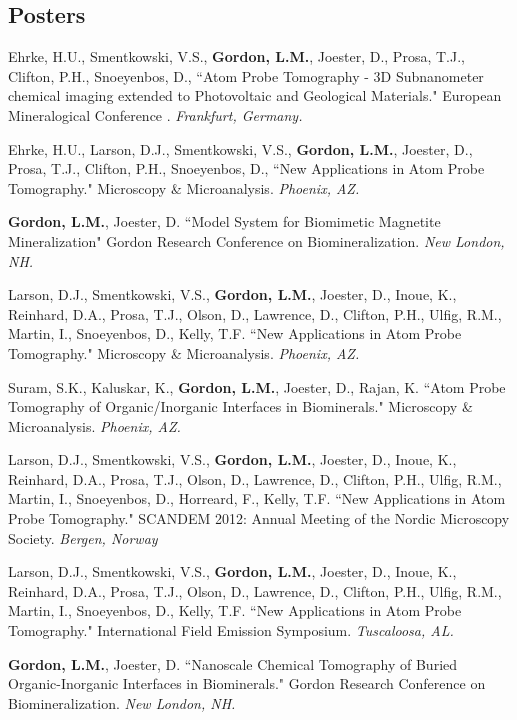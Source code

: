\subsection*{Posters}
Ehrke, H.U., Smentkowski, V.S., \textbf{Gordon, L.M.}, Joester, D., Prosa, T.J., Clifton, P.H., Snoeyenbos, D., ``Atom Probe Tomography - 3D Subnanometer chemical imaging extended to Photovoltaic and Geological Materials." European Mineralogical Conference . \emph{Frankfurt, Germany.}

\begingroup\setlength{\parskip}{0.15cm}
Ehrke, H.U., Larson, D.J., Smentkowski, V.S., \textbf{Gordon, L.M.}, Joester, D., Prosa, T.J., Clifton, P.H., Snoeyenbos, D., ``New Applications in Atom Probe Tomography." Microscopy \& Microanalysis. \emph{Phoenix, AZ.}

\textbf{Gordon, L.M.}, Joester, D. ``Model System for Biomimetic Magnetite Mineralization" Gordon Research Conference on Biomineralization. \emph{New London, NH.}

Larson, D.J., Smentkowski, V.S., \textbf{Gordon, L.M.}, Joester, D., Inoue, K.,  Reinhard, D.A., Prosa, T.J., Olson, D., Lawrence, D., Clifton, P.H., Ulfig, R.M., Martin, I., Snoeyenbos, D., Kelly, T.F. ``New Applications in Atom Probe Tomography." Microscopy \& Microanalysis. \emph{Phoenix, AZ.}

Suram, S.K., Kaluskar, K., \textbf{Gordon, L.M.}, Joester, D., Rajan, K. ``Atom Probe Tomography of Organic/Inorganic Interfaces in Biominerals." Microscopy \& Microanalysis. \emph{Phoenix, AZ.}

Larson, D.J., Smentkowski, V.S., \textbf{Gordon, L.M.}, Joester, D., Inoue, K.,  Reinhard, D.A., Prosa, T.J., Olson, D., Lawrence, D., Clifton, P.H., Ulfig, R.M., Martin, I., Snoeyenbos, D., Horreard, F., Kelly, T.F. ``New Applications in Atom Probe Tomography." SCANDEM 2012: Annual Meeting of the Nordic Microscopy Society. \emph{Bergen, Norway}

Larson, D.J., Smentkowski, V.S., \textbf{Gordon, L.M.}, Joester, D., Inoue, K.,  Reinhard, D.A., Prosa, T.J., Olson, D., Lawrence, D., Clifton, P.H., Ulfig, R.M., Martin, I., Snoeyenbos, D.,  Kelly, T.F. ``New Applications in Atom Probe Tomography." International Field Emission Symposium. \emph{Tuscaloosa, AL.}

\textbf{Gordon, L.M.}, Joester, D. ``Nanoscale Chemical Tomography of Buried Organic-Inorganic Interfaces in Biominerals." Gordon Research Conference on Biomineralization. \emph{New London, NH.}

